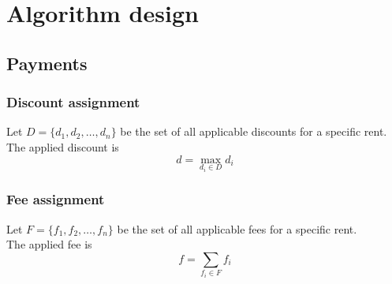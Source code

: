\section{Algorithm design}
\subsection{Payments}
\subsubsection{Discount assignment}
Let $D = \lbrace d_1,d_2,\ldots,d_n\rbrace$ be the set of all applicable discounts for a specific rent.\\
The applied discount is $$d = \max_{d_i\in D} d_i$$

\subsubsection{Fee assignment}
Let $F = \lbrace f_1,f_2,\ldots,f_n\rbrace$ be the set of all applicable fees for a specific rent.\\
The applied fee is $$f = \sum_{f_i\in F} f_i$$

